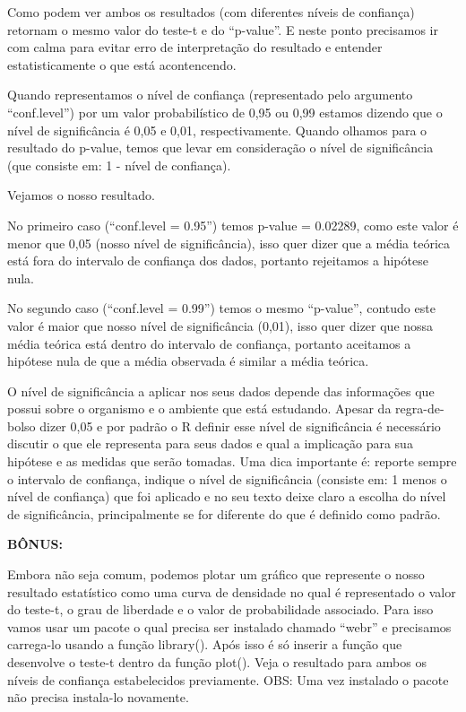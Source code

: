 \documentclass[titlepage, oneside, openany, a4paper]{book}
\begin{document}
Como podem ver ambos os resultados (com diferentes níveis de confiança) retornam o mesmo valor do teste-t e do ``p-value''. E neste ponto precisamos ir com calma para evitar erro de interpretação do resultado e entender estatisticamente o que está acontencendo.

Quando representamos o nível de confiança (representado pelo argumento ``conf.level'') por um valor probabilístico de 0,95 ou 0,99 estamos dizendo que o nível de significância é 0,05 e 0,01, respectivamente. Quando olhamos para o resultado do p-value, temos que levar em consideração o nível de significância (que consiste em: 1 - nível de confiança).

Vejamos o nosso resultado.

No primeiro caso (``conf.level = 0.95'') temos p-value = 0.02289, como este valor é menor que 0,05 (nosso nível de significância), isso quer dizer que a média teórica está fora do intervalo de confiança dos dados, portanto rejeitamos a hipótese nula.

No segundo caso (``conf.level = 0.99'') temos o mesmo ``p-value'', contudo este valor é maior que nosso nível de significância (0,01), isso quer dizer que nossa média teórica está dentro do intervalo de confiança, portanto aceitamos a hipótese nula de que a média observada é similar a média teórica.

O nível de significância a aplicar nos seus dados depende das informações que possui sobre o organismo e o ambiente que está estudando. Apesar da regra-de-bolso dizer 0,05 e por padrão o R definir esse nível de significância é necessário discutir o que ele representa para seus dados e qual a implicação para sua hipótese e as medidas que serão tomadas. Uma dica importante é: reporte sempre o intervalo de confiança, indique o nível de significância (consiste em: 1 menos o nível de confiança) que foi aplicado e no seu texto deixe claro a escolha do nível de significância, principalmente se for diferente do que é definido como padrão.

\textbf{BÔNUS:}

Embora não seja comum, podemos plotar um gráfico que represente o nosso resultado estatístico como uma curva de densidade no qual é representado o valor do teste-t, o grau de liberdade e o valor de probabilidade associado. Para isso vamos usar um pacote o qual precisa ser instalado chamado ``webr'' e precisamos carrega-lo usando a função library(). Após isso é só inserir a função que desenvolve o teste-t dentro da função plot(). Veja o resultado para ambos os níveis de confiança estabelecidos previamente. OBS: Uma vez instalado o pacote não precisa instala-lo novamente.
\end{document}
